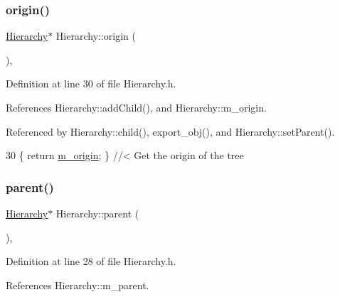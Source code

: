 \mbox{\label{classHierarchy_aee461dc930ce3871636ff87f075b1b83}} 
\subsubsection{\texorpdfstring{origin()}{origin()}}
{\footnotesize\ttfamily \hyperlink{classHierarchy}{Hierarchy}$\ast$ Hierarchy\+::origin (\begin{DoxyParamCaption}{ }\end{DoxyParamCaption})\hspace{0.3cm}{\ttfamily [inline]}, {\ttfamily [inherited]}}



Definition at line 30 of file Hierarchy.\+h.



References Hierarchy\+::add\+Child(), and Hierarchy\+::m\+\_\+origin.



Referenced by Hierarchy\+::child(), export\+\_\+obj(), and Hierarchy\+::set\+Parent().


\begin{DoxyCode}
30 \{ \textcolor{keywordflow}{return} \hyperlink{classHierarchy_a16c73e557d3a7c156ffb5dc4102d148e}{m\_origin}; \}  \textcolor{comment}{//< Get the origin of the tree}
\end{DoxyCode}
\mbox{\label{classHierarchy_a1c7bec8257e717f9c1465e06ebf845fc}} 
\subsubsection{\texorpdfstring{parent()}{parent()}\hspace{0.1cm}{\footnotesize\ttfamily [1/2]}}
{\footnotesize\ttfamily \hyperlink{classHierarchy}{Hierarchy}$\ast$ Hierarchy\+::parent (\begin{DoxyParamCaption}{ }\end{DoxyParamCaption})\hspace{0.3cm}{\ttfamily [inline]}, {\ttfamily [inherited]}}



Definition at line 28 of file Hierarchy.\+h.



References Hierarchy\+::m\+\_\+parent.



